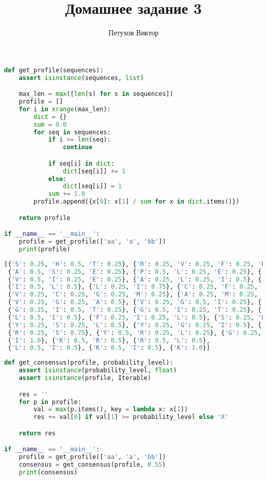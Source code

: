 \documentclass{report}
\title{Домашнее задание 3}
\author{Петухов Виктор}
\begin{document}
 

\begin{lstlisting}[language=Python, caption={Получение профайла}]
def get_profile(sequences):
	assert isinstance(sequences, list)

	max_len = max([len(s) for s in sequences])
	profile = []
	for i in xrange(max_len):
		dict = {}
		sum = 0.0
		for seq in sequences:
			if i >= len(seq):
				continue

			if seq[i] in dict:
				dict[seq[i]] += 1
			else:
				dict[seq[i]] = 1
			sum += 1.0
		profile.append({x[0]: x[1] / sum for x in dict.items()})

	return profile

if __name__ == '__main__':
	profile = get_profile(['aa', 'a', 'bb'])
	print(profile)
\end{lstlisting}


\begin{lstlisting}[language=Python, caption={Результат работы}]
[{'S': 0.25, 'H': 0.5, 'T': 0.25}, {'R': 0.25, 'V': 0.25, 'F': 0.25, 'H': 0.25}, {'F': 0.25, 'S': 0.25, 'P': 0.5}, 
 {'A': 0.5, 'S': 0.25, 'E': 0.25}, {'P': 0.5, 'L': 0.25, 'E': 0.25}, {'V': 0.75, 'P': 0.25}, 
 {'V': 0.5, 'I': 0.25, 'E': 0.25}, {'A': 0.25, 'L': 0.25, 'I': 0.5}, {'I': 0.5, 'L': 0.25, 'T': 0.25}, 
 {'I': 0.5, 'L': 0.5}, {'L': 0.25, 'I': 0.75}, {'C': 0.25, 'F': 0.25, 'I': 0.5}, {'V': 0.25, 'F': 0.25, 'G': 0.25, 'L': 0.25}, 
 {'V': 0.25, 'C': 0.25, 'G': 0.25, 'M': 0.25}, {'A': 0.25, 'M': 0.25, 'V': 0.5}, {'A': 0.25, 'G': 0.25, 'M': 0.5}, 
 {'V': 0.25, 'G': 0.25, 'A': 0.5}, {'V': 0.25, 'G': 0.5, 'I': 0.25}, {'V': 0.25, 'G': 0.25, 'I': 0.5}, 
 {'G': 0.25, 'I': 0.5, 'T': 0.25}, {'G': 0.5, 'I': 0.25, 'T': 0.25}, {'L': 0.25, 'I': 0.25, 'T': 0.5}, 
 {'L': 0.5, 'I': 0.5}, {'F': 0.25, 'I': 0.25, 'L': 0.5}, {'S': 0.25, 'L': 0.5, 'I': 0.25}, 
 {'Y': 0.25, 'S': 0.25, 'L': 0.5}, {'Y': 0.25, 'G': 0.25, 'I': 0.5}, {'G': 0.25, 'I': 0.75}, 
 {'R': 0.25, 'S': 0.75}, {'Y': 0.5, 'R': 0.25, 'L': 0.25}, {'G': 0.25, 'L': 0.5, 'T': 0.25}, 
 {'I': 1.0}, {'K': 0.5, 'R': 0.5}, {'R': 0.5, 'L': 0.5}, 
 {'L': 0.5, 'I': 0.5}, {'K': 0.5, 'I': 0.5}, {'K': 1.0}]
\end{lstlisting}


\begin{lstlisting}[language=Python, caption={Получение консенсуса}]
def get_consensus(profile, probability_level):
	assert isinstance(probability_level, float)
	assert isinstance(profile, Iterable)

	res = ''
	for p in profile:
		val = max(p.items(), key = lambda x: x[1])
		res += val[0] if val[1] >= probability_level else 'X'

	return res

if __name__ == '__main__':
	profile = get_profile(['aa', 'a', 'bb'])
	consensus = get_consensus(profile, 0.55)
	print(consensus)
\end{lstlisting}
\end{document}
